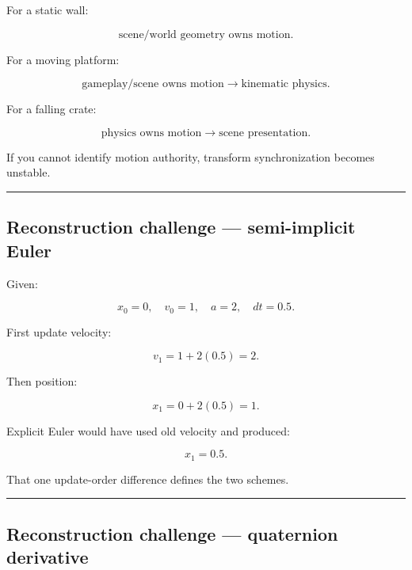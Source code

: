 \hypertarget{06-engine-ii-ch038-reconstruction-challenge-body-ownership}{}

For a static wall:

\[
\text{scene/world geometry owns motion}.
\]

For a moving platform:

\[
\text{gameplay/scene owns motion}
\rightarrow
\text{kinematic physics}.
\]

For a falling crate:

\[
\text{physics owns motion}
\rightarrow
\text{scene presentation}.
\]

If you cannot identify motion authority, transform synchronization becomes unstable.

\begin{center}\rule{0.5\linewidth}{0.5pt}\end{center}

\subsection{Reconstruction challenge --- semi-implicit Euler}\label{06-engine-ii-ch038-reconstruction-challenge-semi-implicit-euler}

\hypertarget{06-engine-ii-ch038-reconstruction-challenge-semi-implicit-euler}{}

Given:

\[
x_0=0,
\quad
v_0=1,
\quad
a=2,
\quad
dt=0.5.
\]

First update velocity:

\[
v_1
=
1+2(0.5)
=
2.
\]

Then position:

\[
x_1
=
0+2(0.5)
=
1.
\]

Explicit Euler would have used old velocity and produced:

\[
x_1=0.5.
\]

That one update-order difference defines the two schemes.

\begin{center}\rule{0.5\linewidth}{0.5pt}\end{center}

\subsection{Reconstruction challenge --- quaternion derivative}\label{06-engine-ii-ch038-reconstruction-challenge-quaternion-derivative}

\hypertarget{06-engine-ii-ch038-reconstruction-challenge-quaternion-derivative}{}

